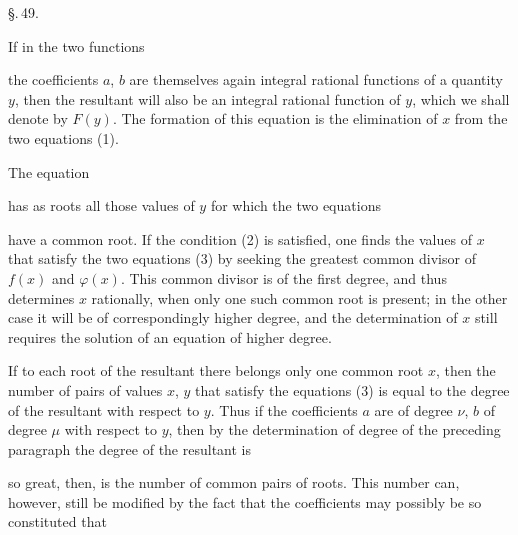 
\begin{center}
\S.\,49.

\end{center}

If in the two functions


the coefficients $a$, $b$ are themselves again integral rational functions
of a quantity $y$, then the resultant will also be an integral
rational function of $y$, which we shall denote by $F(y)$.
The formation of this equation is the elimination of
$x$ from the two equations (1).

The equation


has as roots all those values of $y$ for which the two
equations


have a common root. If the condition (2) is satisfied,
one finds the values of $x$ that satisfy the two equations
(3) by seeking the greatest common divisor
of $f(x)$ and $\varphi(x)$. This common divisor
is of the first degree, and thus determines $x$ rationally, when
only one such common root is present; in the other
case it will be of correspondingly higher degree, and the
determination of $x$ still requires the solution of an equation
of higher degree.

If to each root of the resultant there belongs only one common
root $x$, then the number of pairs of values $x$, $y$ that
satisfy the equations (3) is equal to the degree of the resultant
with respect to $y$. Thus if the coefficients $a$ are of degree $\nu$, $b$
of degree $\mu$ with respect to $y$, then by the determination of degree
of the preceding paragraph the degree of the resultant is


so great, then, is the number of common pairs of roots.
This number can, however, still be modified by the fact that
the coefficients may possibly be so constituted that
